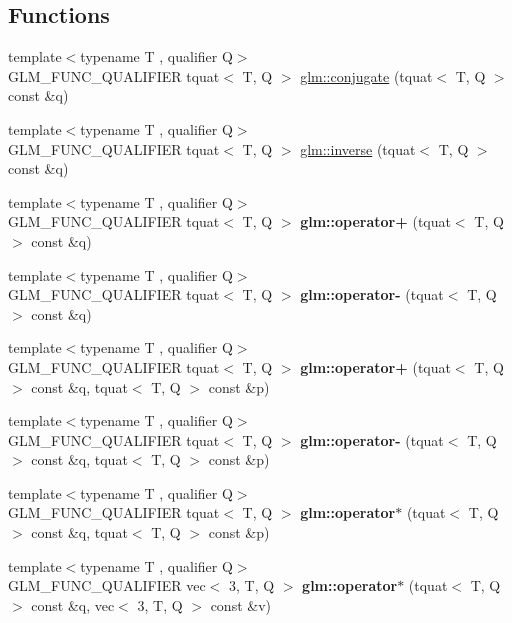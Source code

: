 \subsection*{Functions}
\begin{DoxyCompactItemize}
\item 
{\footnotesize template$<$typename T , qualifier Q$>$ }\\G\+L\+M\+\_\+\+F\+U\+N\+C\+\_\+\+Q\+U\+A\+L\+I\+F\+I\+ER tquat$<$ T, Q $>$ \hyperlink{group__gtc__quaternion_gac40833db608deda477f018767b9a1cad}{glm\+::conjugate} (tquat$<$ T, Q $>$ const \&q)
\item 
{\footnotesize template$<$typename T , qualifier Q$>$ }\\G\+L\+M\+\_\+\+F\+U\+N\+C\+\_\+\+Q\+U\+A\+L\+I\+F\+I\+ER tquat$<$ T, Q $>$ \hyperlink{group__gtc__quaternion_gadc59b59ce71daa5586a64a6acf36c072}{glm\+::inverse} (tquat$<$ T, Q $>$ const \&q)
\item 
{\footnotesize template$<$typename T , qualifier Q$>$ }\\G\+L\+M\+\_\+\+F\+U\+N\+C\+\_\+\+Q\+U\+A\+L\+I\+F\+I\+ER tquat$<$ T, Q $>$ {\bfseries glm\+::operator+} (tquat$<$ T, Q $>$ const \&q)
\item 
{\footnotesize template$<$typename T , qualifier Q$>$ }\\G\+L\+M\+\_\+\+F\+U\+N\+C\+\_\+\+Q\+U\+A\+L\+I\+F\+I\+ER tquat$<$ T, Q $>$ {\bfseries glm\+::operator-\/} (tquat$<$ T, Q $>$ const \&q)
\item 
{\footnotesize template$<$typename T , qualifier Q$>$ }\\G\+L\+M\+\_\+\+F\+U\+N\+C\+\_\+\+Q\+U\+A\+L\+I\+F\+I\+ER tquat$<$ T, Q $>$ {\bfseries glm\+::operator+} (tquat$<$ T, Q $>$ const \&q, tquat$<$ T, Q $>$ const \&p)
\item 
{\footnotesize template$<$typename T , qualifier Q$>$ }\\G\+L\+M\+\_\+\+F\+U\+N\+C\+\_\+\+Q\+U\+A\+L\+I\+F\+I\+ER tquat$<$ T, Q $>$ {\bfseries glm\+::operator-\/} (tquat$<$ T, Q $>$ const \&q, tquat$<$ T, Q $>$ const \&p)
\item 
{\footnotesize template$<$typename T , qualifier Q$>$ }\\G\+L\+M\+\_\+\+F\+U\+N\+C\+\_\+\+Q\+U\+A\+L\+I\+F\+I\+ER tquat$<$ T, Q $>$ {\bfseries glm\+::operator$\ast$} (tquat$<$ T, Q $>$ const \&q, tquat$<$ T, Q $>$ const \&p)
\item 
{\footnotesize template$<$typename T , qualifier Q$>$ }\\G\+L\+M\+\_\+\+F\+U\+N\+C\+\_\+\+Q\+U\+A\+L\+I\+F\+I\+ER vec$<$ 3, T, Q $>$ {\bfseries glm\+::operator$\ast$} (tquat$<$ T, Q $>$ const \&q, vec$<$ 3, T, Q $>$ const \&v)

\end{DoxyCompactItemize}
